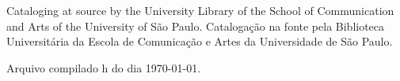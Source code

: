 \begin{fichacatalografica}
    \vspace*{\fill}

    \begin{center}

        \lang
        {Cataloging at source by the University Library of the School of Communication and Arts of the University of São Paulo.}
        {Catalogação na fonte pela Biblioteca Universitária da Escola de Comunicação e Artes da Universidade de São Paulo.}

        \lang
        {Arquivo compilado \currenttime h do dia \today.}

    \end{center}

\end{fichacatalografica}

